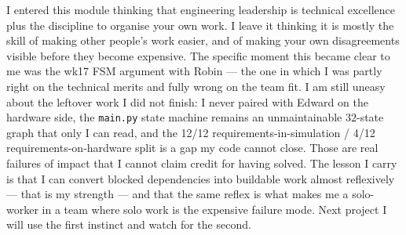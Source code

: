 I entered this module thinking that engineering leadership is technical excellence plus the discipline to organise your own work. I leave it thinking it is mostly the skill of making other people's work easier, and of making your own disagreements visible before they become expensive. The specific moment this became clear to me was the wk17 FSM argument with Robin --- the one in which I was partly right on the technical merits and fully wrong on the team fit. I am still uneasy about the leftover work I did not finish: I never paired with Edward on the hardware side, the \texttt{main.py} state machine remains an unmaintainable 32-state graph that only I can read, and the 12/12 requirements-in-simulation / 4/12 requirements-on-hardware split is a gap my code cannot close. Those are real failures of impact that I cannot claim credit for having solved. The lesson I carry is that I can convert blocked dependencies into buildable work almost reflexively --- that is my strength --- and that the same reflex is what makes me a solo-worker in a team where solo work is the expensive failure mode. Next project I will use the first instinct and watch for the second.
